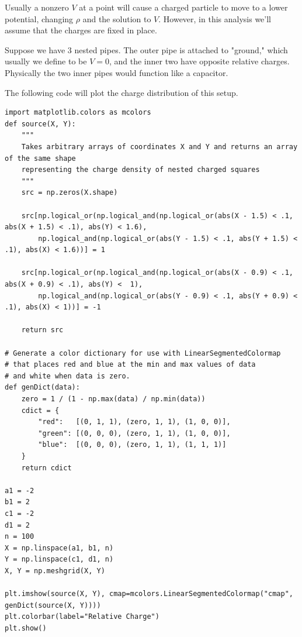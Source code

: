 Usually a nonzero $V$ at a point will cause a charged particle to move to a lower potential, changing $\rho$ and the solution to $V$.
However, in this analysis we'll assume that the charges are fixed in place.

Suppose we have 3 nested pipes.
The outer pipe is attached to "ground," which usually we define to be $V=0$, and the inner two have opposite relative charges.
Physically the two inner pipes would function like a capacitor.

The following code will plot the charge distribution of this setup.
\begin{lstlisting}
import matplotlib.colors as mcolors
def source(X, Y):
    """
    Takes arbitrary arrays of coordinates X and Y and returns an array of the same shape
    representing the charge density of nested charged squares
    """
    src = np.zeros(X.shape)

    src[np.logical_or(np.logical_and(np.logical_or(abs(X - 1.5) < .1, abs(X + 1.5) < .1), abs(Y) < 1.6),
        np.logical_and(np.logical_or(abs(Y - 1.5) < .1, abs(Y + 1.5) < .1), abs(X) < 1.6))] = 1

    src[np.logical_or(np.logical_and(np.logical_or(abs(X - 0.9) < .1, abs(X + 0.9) < .1), abs(Y) <  1),
        np.logical_and(np.logical_or(abs(Y - 0.9) < .1, abs(Y + 0.9) < .1), abs(X) < 1))] = -1

    return src

# Generate a color dictionary for use with LinearSegmentedColormap
# that places red and blue at the min and max values of data
# and white when data is zero.
def genDict(data):
    zero = 1 / (1 - np.max(data) / np.min(data))
    cdict = {
        "red":   [(0, 1, 1), (zero, 1, 1), (1, 0, 0)],
        "green": [(0, 0, 0), (zero, 1, 1), (1, 0, 0)],
        "blue":  [(0, 0, 0), (zero, 1, 1), (1, 1, 1)]
    }
    return cdict

a1 = -2
b1 = 2
c1 = -2
d1 = 2
n = 100
X = np.linspace(a1, b1, n)
Y = np.linspace(c1, d1, n)
X, Y = np.meshgrid(X, Y)

plt.imshow(source(X, Y), cmap=mcolors.LinearSegmentedColormap("cmap", genDict(source(X, Y))))
plt.colorbar(label="Relative Charge")
plt.show()
\end{lstlisting}

